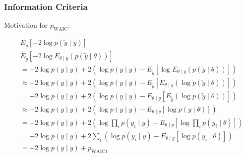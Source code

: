 \documentclass{beamer}
\begin{document}
\begin{frame}
\frametitle{Information Criteria}

Motivation for $p_{\text{WAIC}}$:

\begin{align*}
&E_{\tilde{y}}\left[ -2  \log   p(\tilde{y} \mid y)  \right] \\
&E_{\tilde{y}}\left[ -2  \log  E_{\theta \mid y} ( p(\tilde{y} \mid \theta) ) \right] \\
&= - 2\log p(y \mid y) + 2\left( \log p(y \mid y) - E_{\tilde{y}}\left[  \log  E_{\theta \mid y} ( p(\tilde{y} \mid \theta) ) \right] \right) \\
&\approx - 2\log p(y \mid y) + 2\left( \log p(y \mid y) - E_{\tilde{y}}\left[   E_{\theta \mid y} ( \log  p(\tilde{y} \mid \theta) ) \right] \right) \\
&= - 2\log p(y \mid y) + 2\left( \log p(y \mid y) - E_{\theta \mid y}\left[   E_{\tilde{y}} (\log  p(\tilde{y} \mid \theta) ) \right] \right) \\
&\approx - 2\log p(y \mid y) + 2\left( \log p(y \mid y) - E_{\theta \mid y}\left[  \log   p(y \mid \theta)  \right] \right) \\
&= - 2\log p(y \mid y) + 2\left( \log \prod_i p(y_i \mid y) - E_{\theta \mid y}\left[  \log   \prod_i p(y_i \mid \theta)  \right] \right) \\
&= - 2\log p(y \mid y) + 2 \sum_i \left(  \log p(y_i \mid y) - E_{\theta \mid y}\left[ \log p(y_i \mid \theta)  \right] \right) \\
&= - 2\log p(y \mid y) + p_{\text{WAIC} 1}
\end{align*}



\end{frame}
\end{document}
